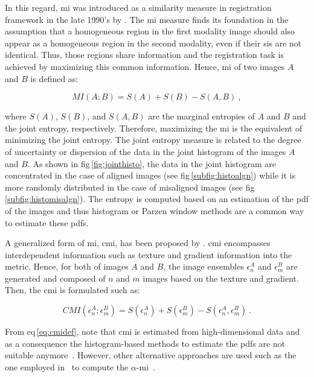 In this regard, \ac{mi} was introduced as a similarity measure in registration framework in the late 1990's by \citeauthor{Pluim2003}.
The \ac{mi} measure finds its foundation in the assumption that a homogeneous region in the first modality image should also appear as a homogeneous region in the second modality, even if their \acp{si} are not identical.
Thus, those regions share information and the registration task is achieved by maximizing this common information.
Hence, \Ac{mi} of two images $A$ and $B$ is defined as:

\begin{equation}
	MI(A;B) = S(A) + S(B) - S(A,B) \ ,
	\label{eq:midef}
\end{equation}

\noindent where $S(A)$, $S(B)$, and $S(A,B)$ are the marginal entropies of $A$ and $B$ and the joint entropy, respectively.
Therefore, maximizing the \ac{mi} is the equivalent of minimizing the joint entropy. 
The joint entropy measure is related to the degree of uncertainty or dispersion of the data in the joint histogram of the images $A$ and $B$.
As shown in \acs{fig}\,\ref{fig:jointhisto}, the data in the joint histogram are concentrated in the case of aligned images (see \acs{fig}\,\ref{subfig:histoalgn}) while it is more randomly distributed in the case of misaligned images (see \acs{fig}\,\ref{subfig:histomisalgn}).
The entropy is computed based on an estimation of the \ac{pdf} of the images and thus histogram or Parzen window methods are a common way to estimate these \acp{pdf}.

A generalized form of \ac{mi}, \ac{cmi}, has been proposed by \citeauthor{Chappelow2011}.
\ac{cmi} encompasses interdependent information such as texture and gradient information into the metric.
Hence, for both of images $A$ and $B$, the image ensembles $\epsilon^{A}_n$ and $\epsilon^{B}_m$ are generated and composed of $n$ and $m$ images based on the texture and gradient.
Then, the \ac{cmi} is formulated such as:

\begin{equation}
	CMI(\epsilon^{A}_n;\epsilon^{B}_m) = S(\epsilon^{A}_n) + S(\epsilon^{B}_m) - S(\epsilon^{A}_n,\epsilon^{B}_m) \ .
	\label{eq:cmidef}
\end{equation}

From \acs{eq}\,\eqref{eq:cmidef}, note that \ac{cmi} is estimated from high-dimensional data and as a consequence the histogram-based methods to estimate the \acp{pdf} are not suitable anymore~\cite{Chappelow2011}. 
However, other alternative approaches are used such as the one employed in~\cite{Staring2009} to compute the $\alpha$-\ac{mi}~\cite{Hero2002}.

